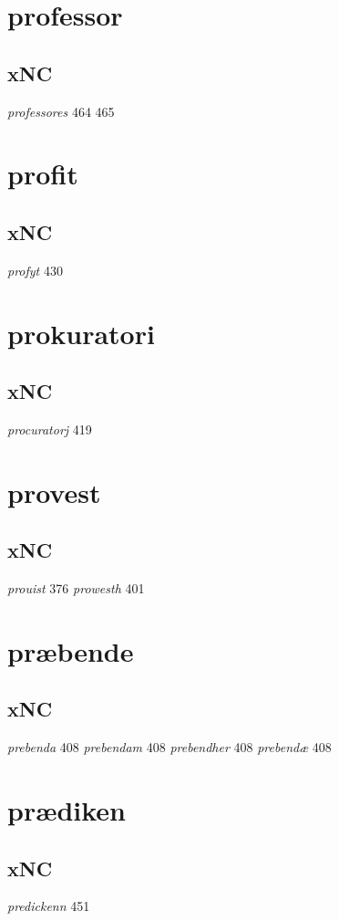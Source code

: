\documentclass[a4paper,twocolumn]{article}
\begin{document}
\section{professor}
\label{sec:org4b21a4a}
\subsection{xNC}
\label{sec:org2fe5b93}
\emph{professores} 464 465 
\section{profit}
\label{sec:org1159000}
\subsection{xNC}
\label{sec:orgab8183e}
\emph{profyt} 430 
\section{prokuratori}
\label{sec:org2444808}
\subsection{xNC}
\label{sec:org67c5c1b}
\emph{procuratorj} 419 
\section{provest}
\label{sec:org5982752}
\subsection{xNC}
\label{sec:org6874ff5}
\emph{prouist} 376 \emph{prowesth} 401 
\section{præbende}
\label{sec:org11d0b04}
\subsection{xNC}
\label{sec:org89d2ead}
\emph{prebenda} 408 \emph{prebendam} 408 \emph{prebendher} 408 \emph{prebendæ} 408 
\section{prædiken}
\label{sec:org6e3f295}
\subsection{xNC}
\label{sec:org9fdf624}
\emph{predickenn} 451 
\end{document}
